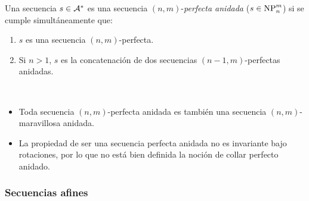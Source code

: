 \begin{defi}
  Una secuencia $s \in \mathcal{A}^*$ es una secuencia $(n,m)$-\emph{perfecta
    anidada} ($s \in \text{NP}_{n}^{m}$) si se cumple simultáneamente que:
  \begin{enumerate}
    \item $s$ es una secuencia $(n,m)$-perfecta.
    \item Si $n > 1$, $s$ es la concatenación de dos secuencias
          $(n-1,m)$-perfectas anidadas.
  \end{enumerate}
\end{defi}

\begin{obs}\ %
  \begin{itemize}
    \item Toda secuencia $(n,m)$-perfecta anidada es también una secuencia
          $(n,m)$-maravillosa anidada.
    \item La propiedad de ser una secuencia perfecta anidada no es invariante
          bajo rotaciones, por lo que no está bien definida la noción de collar
          perfecto anidado.
  \end{itemize}
\end{obs}

\subsubsection{Secuencias afines}

